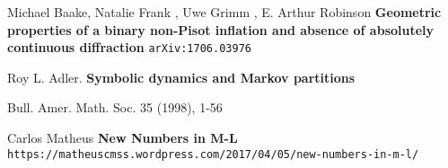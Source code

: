 \documentclass[12pt]{article}
\begin{document}
\begin{thebibliography}{}

\item Michael Baake, Natalie Frank , Uwe Grimm , E. Arthur Robinson 
\textbf{Geometric properties of a binary non-Pisot inflation and absence of absolutely continuous diffraction} \texttt{arXiv:1706.03976} 

\item Roy L. Adler.  \textbf{Symbolic dynamics and Markov partitions}

Bull. Amer. Math. Soc. 35 (1998), 1-56 

\item Carlos Matheus \textbf{New Numbers in M-L}\\ \texttt{https://matheuscmss.wordpress.com/2017/04/05/new-numbers-in-m-l/}

\end{thebibliography}
\end{document}
